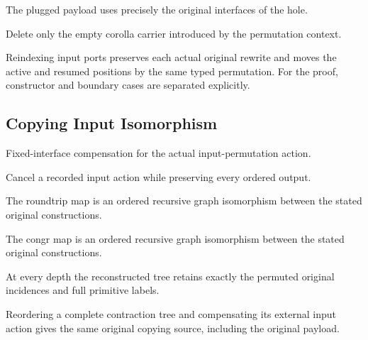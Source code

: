The plugged payload uses precisely the original interfaces of the hole.
\par{}

Delete only the empty corolla carrier introduced by the permutation context.
\par{}

Reindexing input ports preserves each actual original rewrite and moves the active and resumed positions by the same typed permutation.
For the proof, constructor and boundary cases are separated explicitly.
\par{}

\subsection{Copying Input Isomorphism}
Fixed-interface compensation for the actual input-permutation action.

Cancel a recorded input action while preserving every ordered output.
\par{}

The roundtrip map is an ordered recursive graph isomorphism between the stated original constructions.
\par{}

The congr map is an ordered recursive graph isomorphism between the stated original constructions.
\par{}

At every depth the reconstructed tree retains exactly the permuted original incidences and full primitive labels.
\par{}

Reordering a complete contraction tree and compensating its external input action gives the same original copying source, including the original payload.
\par{}

